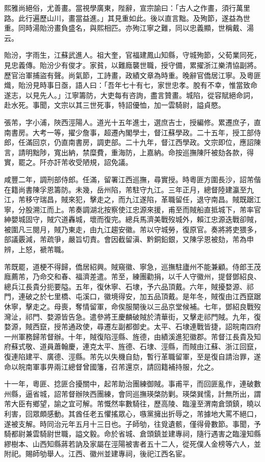 \begin{pinyinscope}
熙雅尚絕俗，尤善畫。當視學廣東，陛辭，宣宗諭曰：「古人之作畫，須行萬里路。此行遍歷山川，畫當益進。」其見重如此。後以直言黜。及殉節，遂益為世重。同時湯貽汾畫負盛名，與熙相匹。亦殉江寧之難，同以忠義顯，世稱戴、湯云。

貽汾，字雨生，江蘇武進人。祖大奎，官福建鳳山知縣，守城殉節，父荀業同死，見忠義傳。貽汾少有俊才。家貧，以難廕襲世職，授守備，累擢浙江樂清協副將。歷官治軍捕盜有聲。尚氣節，工詩畫，政績文章為時重。晚辭官僑居江寧。及粵匪熾，貽汾見時事日亟，語人曰：「吾年七十有七，家世忠孝。脫有不幸，惟當致命遂志，以見先人。」江寧籌防，大吏每有咨詢，盡言贊畫。城陷，從容賦絕命詞，赴水死。事聞，文宗以其三世死事，特詔優恤，加一雲騎尉，謚貞愍。

張芾，字小浦，陜西涇陽人。道光十五年進士，選庶吉士，授編修。累遷庶子，直南書房。大考一等，擢少詹事，超遷內閣學士，督江蘇學政。二十五年，授工部侍郎，任滿回京，仍直南書房，調吏部。二十九年，督江西學政。文宗即位，應詔陳言，請明黜陟，寬出納，禁糜費，重海防，上嘉納。命按巡撫陳阡被劾各款，得實，罷之。阡亦訐芾收受陋規，詔免議。

咸豐二年，調刑部侍郎。任滿，留署江西巡撫，尋實授。時粵匪方圍長沙，詔芾偕在籍尚書陳孚恩籌防。未幾，岳州陷，芾駐守九江。三年正月，總督陸建瀛至九江，芾移守瑞昌，賊來犯，擊走之，而九江遂陷，革職留任，退守南昌。賊既踞江寧，分股溯江而上。芾奏調湖北按察使江忠源來援，甫至而賊船直抵城下，芾率官紳嬰城固守，賊穴道轟城，壞而復完。總兵馬濟美戰歿城外，賴江忠源迭戰卻賊，被圍凡三閱月，賊乃東走，由九江趨安徽。芾以守城勞，復原官。奏將將吏猥多，部議覈減，芾疏爭，嚴旨切責。會因截留滇、黔銅鉛銀，又陳孚恩被劾，芾為申辨，上怒，褫芾職。

芾既罷，道梗不得歸，僑居紹興。賊窺徽、寧急，巡撫駐廬州不能兼顧。侍郎王茂廕薦芾，乃命交和春、福濟差遣。芾至，練團勸捐，以千人守徽州，提督鄧紹良、總兵江長貴分扼要隘。五年，復休寧、石埭，予六品頂戴。六年，賊擾婺源、祁門，連破之於七里橋、屯溪口，徽境得安，加五品頂戴。是年冬，賊復由江西竄踞休寧，擊走之。母喪，奪情留軍，命俟服闋後以三品京堂候補。七年，鄧紹良戰歿灣沚，祁門、婺源皆告急。遣參將王慶麟破賊於清華街，又擊走祁門賊。九年，復婺源，賊西竄，授芾通政使，尋遷左副都御史。太平、石埭連戰皆捷，詔皖南四府一州軍務歸芾督辦。十年，賊復陷涇縣、旌德，由績溪進犯徽郡。芾督江長貴及知府蘇式敬、道員蕭翰慶，連克太平、旌德、石埭、涇縣，而賊由江蘇、浙江回竄，復連陷建平、廣德、涇縣。芾先以失機自劾，暫行革職留軍，至是復自請治罪，遂命以皖南軍事畀兩江總督曾國籓，召芾還京，請回籍補持服，允之。

十一年，粵匪、捻匪合擾關中，起芾助治團練御賊。事甫平，而回匪亂作，連破數州縣，逼省城，詔芾督辦陜西團練，會同巡撫瑛棨防剿。瑛棨巽懦，計無所出，謂芾大臣有鄉望，諭之宜可解。芾慨然率數騎往，歷高陵、臨潼至渭南倉頭鎮，曉以利害，回眾頗感動。其酋任老五懼搖眾心，嗾黨擁出折辱之，芾據地大罵不絕口，遂被支解。時同治元年五月十三日也。子師劬，往覓遺骸，僅得骨數節。事聞，予騎都尉兼雲騎尉世職，謚文毅。命於省城、倉頭鎮並建專祠，隨行遇害之臨潼知縣繆樹本、山西知縣蔣若訥及家屬在涇陽被害者五十二人，從死僕人金榜等六人，並附祀。賜師劬舉人。江西、徽州並建專祠，後祀江西名宦。


\end{pinyinscope}
